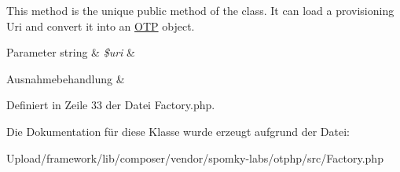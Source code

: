 This method is the unique public method of the class. It can load a provisioning Uri and convert it into an \mbox{\hyperlink{class_o_t_p_h_p_1_1_o_t_p}{O\+TP}} object.


\begin{DoxyParams}[1]{Parameter}
string & {\em \$uri} & \\
\hline
\end{DoxyParams}

\begin{DoxyExceptions}{Ausnahmebehandlung}
{\em } & \\
\hline
\end{DoxyExceptions}


Definiert in Zeile 33 der Datei Factory.\+php.



Die Dokumentation für diese Klasse wurde erzeugt aufgrund der Datei\+:\begin{DoxyCompactItemize}
\item 
Upload/framework/lib/composer/vendor/spomky-\/labs/otphp/src/Factory.\+php\end{DoxyCompactItemize}
